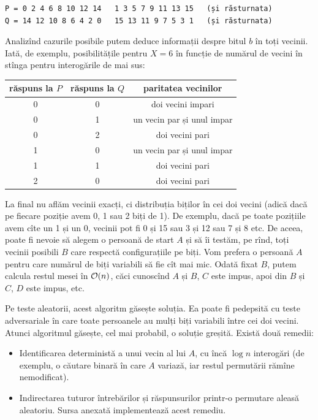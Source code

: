 \documentclass[../main.tex]{subfiles}
\begin{document}
\begin{verbatim}
P = 0 2 4 6 8 10 12 14   1 3 5 7 9 11 13 15   (și răsturnata)
Q = 14 12 10 8 6 4 2 0   15 13 11 9 7 5 3 1   (și răsturnata)
\end{verbatim}

Analizînd cazurile posibile putem deduce informații despre bitul $b$ în toți vecinii. Iată, de exemplu, posibilitățile pentru $X=6$ în funcție de numărul de vecini în stînga pentru interogările de mai sus:

\begin{table}[H]
  \centering
  \begin{tabular}{ c|c|c }
    \hline
    răspuns la $P$ & răspuns la $Q$ & paritatea vecinilor \\
    \hline
    0 & 0 & doi vecini impari \\
    0 & 1 & un vecin par și unul impar \\
    0 & 2 & doi vecini pari \\
    1 & 0 & un vecin par și unul impar \\
    1 & 1 & doi vecini pari \\
    2 & 0 & doi vecini pari \\
    \hline
  \end{tabular}
\end{table}

La final nu aflăm vecinii exacți, ci distribuția biților în cei doi vecini (adică dacă pe fiecare poziție avem 0, 1 sau 2 biți de 1). De exemplu, dacă pe toate pozițiile avem cîte un 1 și un 0, vecinii pot fi 0 și 15 sau 3 și 12 sau 7 și 8 etc. De aceea, poate fi nevoie să alegem o persoană de start $A$ și să îi testăm, pe rînd, toți vecinii posibili $B$ care respectă configurațiile pe biți. Vom prefera o persoană $A$ pentru care numărul de biți variabili să fie cît mai mic. Odată fixat $B$, putem calcula restul mesei în $\mathcal{O}(n)$, căci cunoscînd $A$ și $B$, $C$ este impus, apoi din $B$ și $C$, $D$ este impus, etc.

Pe teste aleatorii, acest algoritm găsește soluția. Ea poate fi pedepsită cu teste adversariale în care toate persoanele au mulți biți variabili între cei doi vecini. Atunci algoritmul găsește, cel mai probabil, o soluție greșită. Există două remedii:

\begin{itemize}
  \item Identificarea deterministă a unui vecin al lui $A$, cu încă $\log n$ interogări (de exemplu, o căutare binară în care $A$ variază, iar restul permutării rămîne nemodificat).
  \item Indirectarea tuturor întrebărilor și răspunsurilor printr-o permutare aleasă aleatoriu. Sursa anexată implementează acest remediu.
\end{itemize}
\end{document}

